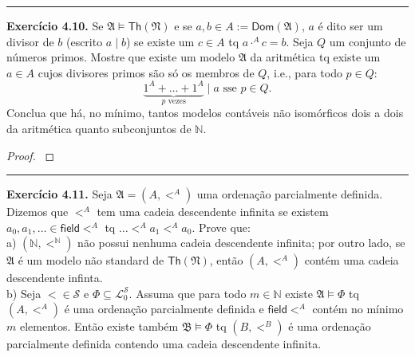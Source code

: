 \documentclass[11pt]{article}
\newcommand{\mc}[1]{\mathcal{#1}}
\newcommand{\mf}[1]{\mathfrak{#1}}
\newcommand{\msf}[1]{\mathsf{#1}}
\newcommand{\mbb}[1]{\mathbb{#1}}
\begin{document}
\hrule

\begin{shaded}
\textbf{Exercício 4.10.} Se $\mf{A}\vDash\msf{Th}(\mf{N})$ e se $a, b\in A:=\msf{Dom}(\mf{A})$, $a$ é dito ser um divisor de $b$ (escrito $a \mid b$) se existe um $c\in A$ tq $a\cdot^Ac=b$. Seja $Q$ um conjunto de números primos. Mostre que existe um modelo $\mf{A}$ da aritmética tq existe um $a\in A$ cujos divisores primos são só os membros de $Q$, i.e., para todo $p\in Q$:
$$\underbrace{1^A+\dots+1^A}_{p\text{ vezes}}\mid a\text{ sse }p\in Q.$$
Conclua que há, no mínimo, tantos modelos contáveis não isomórficos dois a dois da aritmética quanto subconjuntos de $\mbb{N}$.
\end{shaded}

\begin{proof}
    \textbf{\color{red}{PENDENTE}}
\end{proof}

\hrule

\begin{shaded}
\textbf{Exercício 4.11.} Seja $\mf{A}=(A,<^A)$ uma ordenação parcialmente definida. Dizemos que $<^A$ tem uma cadeia descendente infinita se existem $a_0,a_1,\dots\in\msf{field }<^A$ tq $\dots<^Aa_1<^Aa_0$. Prove que:\\
a) $(\mbb{N},<^\mbb{N})$ não possui nenhuma cadeia descendente infinita; por outro lado, se $\mf{A}$ é um modelo não standard de $\msf{Th}(\mf{N})$, então $(A,<^A)$ contém uma cadeia descendente infinta.\\
b) Seja $<\in\mc{S}$ e $\Phi\subseteq\mc{L}_0^\mc{S}$. Assuma que para todo $m\in\mbb{N}$ existe $\mf{A}\vDash\Phi$ tq $(A,<^A)$ é uma ordenação parcialmente definida e $\msf{field }<^A$ contém no mínimo $m$ elementos. Então existe também $\mf{B}\vDash\Phi$ tq $(B,<^B)$ é uma ordenação parcialmente definida contendo uma cadeia descendente infinita.
\end{shaded}
\end{document}
